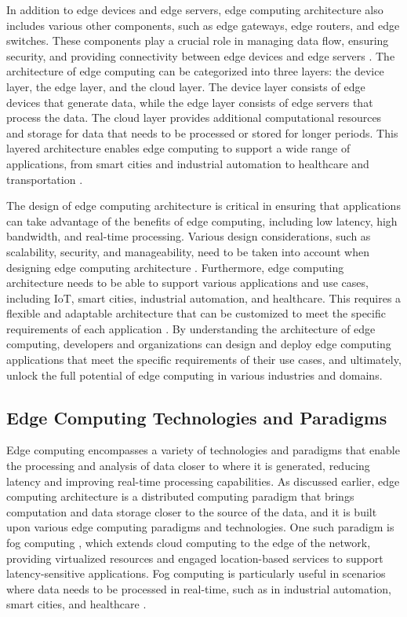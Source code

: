 \documentclass[11pt]{article}
\begin{document}
In addition to edge devices and edge servers, edge computing architecture also includes various other components, such as edge gateways, edge routers, and edge switches. These components play a crucial role in managing data flow, ensuring security, and providing connectivity between edge devices and edge servers \cite{ref12}. The architecture of edge computing can be categorized into three layers: the device layer, the edge layer, and the cloud layer. The device layer consists of edge devices that generate data, while the edge layer consists of edge servers that process the data. The cloud layer provides additional computational resources and storage for data that needs to be processed or stored for longer periods. This layered architecture enables edge computing to support a wide range of applications, from smart cities and industrial automation to healthcare and transportation \cite{ref2}.

The design of edge computing architecture is critical in ensuring that applications can take advantage of the benefits of edge computing, including low latency, high bandwidth, and real-time processing. Various design considerations, such as scalability, security, and manageability, need to be taken into account when designing edge computing architecture \cite{ref28}. Furthermore, edge computing architecture needs to be able to support various applications and use cases, including IoT, smart cities, industrial automation, and healthcare. This requires a flexible and adaptable architecture that can be customized to meet the specific requirements of each application \cite{ref29}. By understanding the architecture of edge computing, developers and organizations can design and deploy edge computing applications that meet the specific requirements of their use cases, and ultimately, unlock the full potential of edge computing in various industries and domains.

\subsection{Edge Computing Technologies and Paradigms}

Edge computing encompasses a variety of technologies and paradigms that enable the processing and analysis of data closer to where it is generated, reducing latency and improving real-time processing capabilities. As discussed earlier, edge computing architecture is a distributed computing paradigm that brings computation and data storage closer to the source of the data, and it is built upon various edge computing paradigms and technologies. One such paradigm is fog computing \cite{ref30}, which extends cloud computing to the edge of the network, providing virtualized resources and engaged location-based services to support latency-sensitive applications. Fog computing is particularly useful in scenarios where data needs to be processed in real-time, such as in industrial automation, smart cities, and healthcare \cite{ref13}.
\end{document}
